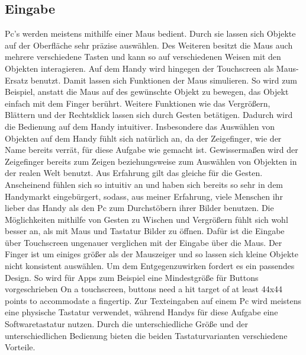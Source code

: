 \subsection{Eingabe} \myCheckmark
Pc's werden meistens mithilfe einer Maus bedient. Durch sie lassen sich Objekte auf der Oberfläche sehr präzise auswählen. Des Weiteren besitzt die Maus auch mehrere verschiedene Tasten und kann so auf verschiedenen Weisen mit den Objekten interagieren.\newline%
Auf dem Handy wird hingegen der Touchscreen als Maus-Ersatz benutzt. Damit lassen sich Funktionen der Maus simulieren. So wird zum Beispiel, anstatt die Maus auf des gewünschte Objekt zu bewegen, das Objekt einfach mit dem Finger berührt. Weitere Funktionen wie das Vergrößern, Blättern und der Rechtsklick lassen sich durch Gesten betätigen.\newline%
	Dadurch wird die Bedienung auf dem Handy intuitiver. %
		 Insbesondere das Auswählen von Objekten auf dem Handy fühlt sich natürlich an, da der Zeigefinger, wie der Name bereits verrät, für diese Aufgabe wie gemacht ist. Gewissermaßen wird der Zeigefinger bereits zum Zeigen beziehungsweise zum Auswählen von Objekten in der realen Welt benutzt.\newline%
		Aus Erfahrung gilt das gleiche für die Gesten. Anscheinend fühlen sich so intuitiv an und haben sich bereits so sehr in dem Handymarkt eingebürgert, sodass, aus meiner Erfahrung, viele Menschen ihr lieber das Handy als den Pc zum Durchstöbern ihrer Bilder benutzen. Die Möglichkeiten mithilfe von Gesten zu Wischen und Vergrößern fühlt sich wohl besser an, als mit Maus und Tastatur Bilder zu öffnen.\newline%
	Dafür ist die Eingabe über Touchscreen ungenauer verglichen mit der Eingabe über die Maus. Der Finger ist um einiges größer als der Mauszeiger und so lassen sich kleine Objekte nicht konsistent auswählen. Um dem Entgegenzuwirken fordert es ein passendes Design. So wird für Apps zum Beispiel eine Mindestgröße für Buttons vorgeschrieben \glqq On a touchscreen, buttons need a hit target of at least 44x44 points to accommodate a fingertip\grqq{}\cite{konventionen_buttonSize}.%
\myNewSection%
Zur Texteingaben auf einem Pc wird meistens eine physische Tastatur verwendet, während Handys für diese Aufgabe eine Softwaretastatur nutzen. Durch die unterschiedliche Größe und der unterschiedlichen Bedienung bieten die beiden Tastaturvarianten verschiedene Vorteile.\newline%
